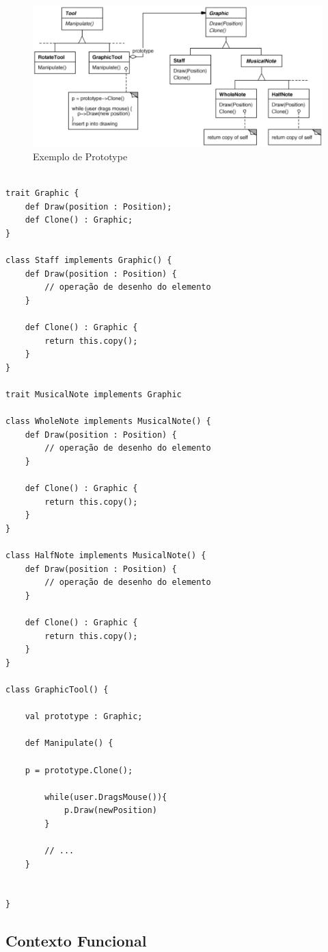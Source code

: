 \begin{figure}[htb]
	\caption{\label{prototype_exemplo}Exemplo de Prototype}
	\begin{center}
	    \includegraphics[scale=0.4]{5_padroes-contexto-funcional/5.1_criacionais/5.1.4_prototype/exemplo_prototype.png}
	\end{center}
\end{figure}

\begin{lstlisting}[caption={Prototype Orientado a Objetos},label=ooprototype]

trait Graphic {
	def Draw(position : Position);
	def Clone() : Graphic;
}

class Staff implements Graphic() {
	def Draw(position : Position) {
		// operação de desenho do elemento
	}

	def Clone() : Graphic {
		return this.copy();
	}
}

trait MusicalNote implements Graphic

class WholeNote implements MusicalNote() {
	def Draw(position : Position) {
		// operação de desenho do elemento
	}

	def Clone() : Graphic {
		return this.copy();
	}
}

class HalfNote implements MusicalNote() {
	def Draw(position : Position) {
		// operação de desenho do elemento
	}
	
	def Clone() : Graphic {
		return this.copy();
	}
}

class GraphicTool() {

	val prototype : Graphic;

	def Manipulate() {
		
	p = prototype.Clone();

		while(user.DragsMouse()){
			p.Draw(newPosition)
		}

		// ...
	}


}

\end{lstlisting}

\subsection*{Contexto Funcional}


\begin{lstlisting}[caption={Prototype Funcional},label=fpprototype]
    

    
\end{lstlisting}